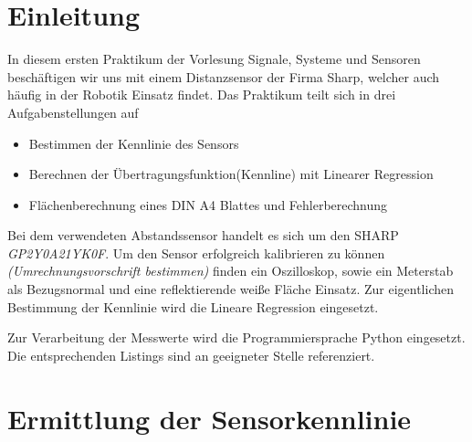 \documentclass[12pt,oneside,a4paper]{report}
\begin{document}




\clearpage

%
%


%
%


%
%


%
%




\setcounter{page}{1}
%
%
\chapter{Einleitung}
\label{chap:EINL}
In diesem ersten Praktikum der Vorlesung Signale, Systeme und Sensoren beschäftigen wir uns mit einem Distanzsensor der Firma Sharp, welcher auch häufig in der Robotik Einsatz findet. Das Praktikum teilt sich in drei Aufgabenstellungen auf

\begin{itemize}
\item Bestimmen der Kennlinie des Sensors
\item Berechnen der Übertragungsfunktion(Kennline) mit Linearer Regression
\item Flächenberechnung eines DIN A4 Blattes und Fehlerberechnung
\end{itemize}

Bei dem verwendeten Abstandssensor handelt es sich um den SHARP \textit{GP2Y0A21YK0F}. Um den Sensor erfolgreich kalibrieren zu können \textit{(Umrechnungsvorschrift bestimmen)} finden ein Oszilloskop, sowie ein Meterstab als Bezugsnormal und eine reflektierende weiße Fläche Einsatz. Zur eigentlichen Bestimmung der Kennlinie wird die Lineare Regression eingesetzt.

Zur Verarbeitung der Messwerte wird die Programmiersprache Python eingesetzt. Die entsprechenden Listings sind an geeigneter Stelle referenziert.


%
%
\chapter{Ermittlung der Sensorkennlinie}
\label{chap:VERSUCH_1}
\end{document}
